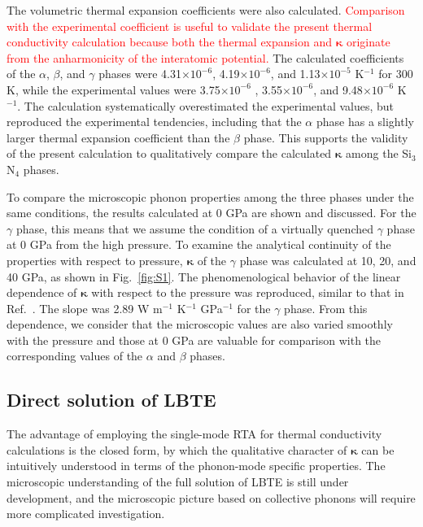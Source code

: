 \documentclass[twocolumn,amsmath,amssymb,a4paper,prb,superscriptaddress,floatfix]{revtex4-1}
\begin{document}
The volumetric thermal expansion coefficients were also calculated. 
\textcolor{red}{Comparison with the experimental coefficient is useful to validate the present
thermal conductivity calculation because both the thermal expansion
and $\boldsymbol{\kappa}$ originate from the anharmonicity of the interatomic
potential.}
The calculated coefficients of the $\alpha$, $\beta$, and $\gamma$ phases were
4.31$\times 10^{-6}$,  4.19$\times 10^{-6}$, and 1.13$\times 10^{-5}$
K$^{-1}$
for 300 K, while the experimental values\cite{minikayev-alpha, gamma-expand}
were 3.75$\times 10^{-6}$ , 3.55$\times 10^{-6}$, and 9.48$\times
10^{-6}$ K$^{-1}$. The calculation systematically overestimated the experimental
values, but reproduced the experimental tendencies, including that the $\alpha$
phase has a slightly larger thermal expansion coefficient than the $\beta$
phase. This supports the validity of the present calculation to qualitatively
compare the calculated $\boldsymbol{\kappa}$ among the Si$_3$N$_4$ phases.

To compare the microscopic phonon properties among the three phases under the
same conditions, the results calculated at 0 GPa are shown and discussed.  For
the $\gamma$ phase, this means that we assume the condition of a virtually
quenched $\gamma$ phase at 0 GPa from the high pressure. To examine the
analytical continuity of the properties with respect to pressure,
$\boldsymbol{\kappa}$ of the $\gamma$ phase was calculated at 10, 20, and 40
GPa, as shown in Fig.~\ref{fig:S1}. The phenomenological behavior of the linear
dependence of $\boldsymbol{\kappa}$ with respect to the pressure was reproduced,
similar to that in Ref.~. The slope was 2.89
W m$^{-1}$ K$^{-1}$ GPa$^{-1}$ for the $\gamma$ phase.  From this dependence, we
consider that the microscopic values are also varied smoothly with the pressure
and those at 0 GPa are valuable for comparison with the corresponding values of
the $\alpha$ and $\beta$ phases.

\subsection{Direct solution of LBTE}

The advantage of employing the single-mode RTA for thermal conductivity
calculations is the closed form, by which the qualitative character of
$\boldsymbol{\kappa}$ can be intuitively understood in terms of the phonon-mode
specific properties. The microscopic understanding of the full solution of LBTE
is still under development,\cite{cepellotti-relaxons} and the microscopic
picture based on collective phonons\cite{hardy-collective} will require more
complicated investigation.
\end{document}
